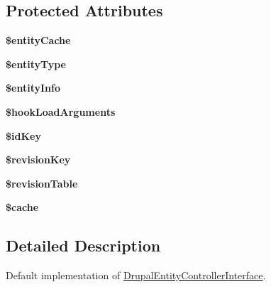 \subsection*{Protected Attributes}
\begin{DoxyCompactItemize}
\item 
\hypertarget{classDrupalDefaultEntityController_acbb2e6a6999ded7c291e1cf86e254176}{
{\bfseries \$entityCache}}
\label{classDrupalDefaultEntityController_acbb2e6a6999ded7c291e1cf86e254176}

\item 
\hypertarget{classDrupalDefaultEntityController_a952f2440f72af738dddba02ee28e9b13}{
{\bfseries \$entityType}}
\label{classDrupalDefaultEntityController_a952f2440f72af738dddba02ee28e9b13}

\item 
\hypertarget{classDrupalDefaultEntityController_a6cd0f67d5c1da3b239fa0649becf4e91}{
{\bfseries \$entityInfo}}
\label{classDrupalDefaultEntityController_a6cd0f67d5c1da3b239fa0649becf4e91}

\item 
\hypertarget{classDrupalDefaultEntityController_a60f93fd1bc54bd165da93470cad902cb}{
{\bfseries \$hookLoadArguments}}
\label{classDrupalDefaultEntityController_a60f93fd1bc54bd165da93470cad902cb}

\item 
\hypertarget{classDrupalDefaultEntityController_a8cd76449f510d31ea480b79c05b04354}{
{\bfseries \$idKey}}
\label{classDrupalDefaultEntityController_a8cd76449f510d31ea480b79c05b04354}

\item 
\hypertarget{classDrupalDefaultEntityController_a9fa43bc75fc4ac8e8ac6d0f428421771}{
{\bfseries \$revisionKey}}
\label{classDrupalDefaultEntityController_a9fa43bc75fc4ac8e8ac6d0f428421771}

\item 
\hypertarget{classDrupalDefaultEntityController_a9ce8e5dc9e34a09f18878d2176321ede}{
{\bfseries \$revisionTable}}
\label{classDrupalDefaultEntityController_a9ce8e5dc9e34a09f18878d2176321ede}

\item 
\hypertarget{classDrupalDefaultEntityController_ac385e4a3ae0cc75de84fa3bfd56ae732}{
{\bfseries \$cache}}
\label{classDrupalDefaultEntityController_ac385e4a3ae0cc75de84fa3bfd56ae732}

\end{DoxyCompactItemize}


\subsection{Detailed Description}
Default implementation of \hyperlink{interfaceDrupalEntityControllerInterface}{DrupalEntityControllerInterface}.

